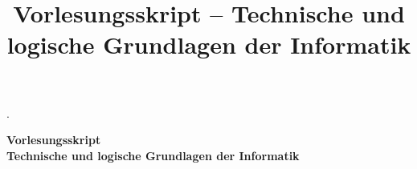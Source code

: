 \documentclass[numbers=endperiod]{scrartcl}
\def\namecorollary{Korollar}
\def\namedefinition{Definition}
\def\nameexercise{Aufgabe}
\def\namelemma{Lemma}
\def\nameproposition{Aussage}
\def\nameremark{Anmerkung}
\def\nametheorem{Satz}
\def\namecorollary{Corollary}
\def\namedefinition{Definition}
\def\nameexercise{Exercise}
\def\namelemma{Lemma}
\def\nameproposition{Proposition}
\def\nameremark{Remark}
\def\nametheorem{Theorem}
\begin{document}
\author{}
\title{Vorlesungsskript -- Technische und logische Grundlagen der Informatik}

\theoremstyle{definition}
\newtheorem{definition}{\namedefinition}

\theoremstyle{remark}
\newtheorem{remark}{\nameremark}

\theoremstyle{plain}
\newtheorem{proposition}{\nameproposition}
\newtheorem{theorem}{\nametheorem}
\newtheorem{lemma}{\namelemma}
\newtheorem{corollary}{\namecorollary}

  {}         %
  {}         %
  {\upshape} %
  {}         %
  {\bfseries}%
  {}         %
  { }        %
  {%
.%
}
\theoremstyle{exercise}
\newtheorem{exercise}{\nameexercise}[section]


\begin{center}
\Huge{\textbf{Vorlesungsskript}}\\
\Large{\textbf{Technische und logische Grundlagen der Informatik}}
\end{center}

\end{document}
